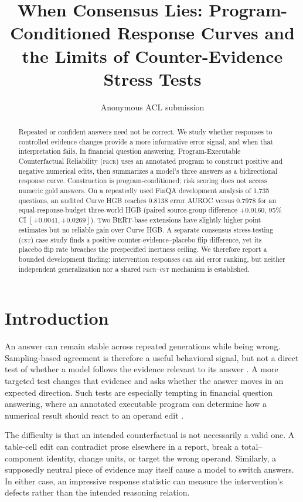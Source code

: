 \documentclass[11pt]{article}
\title{When Consensus Lies: Program-Conditioned Response Curves and the Limits of Counter-Evidence Stress Tests}
\author{Anonymous ACL submission}
\newcommand{\PECR}{\textsc{pecr}}
\newcommand{\CST}{\textsc{cst}}
\begin{document}
\maketitle

\begin{abstract}
Repeated or confident answers need not be correct. We study whether responses to controlled evidence changes provide a more informative error signal, and when that interpretation fails. In financial question answering, Program-Executable Counterfactual Reliability (\PECR{}) uses an annotated program to construct positive and negative numerical edits, then summarizes a model's three answers as a bidirectional response curve. Construction is program-conditioned; risk scoring does not access numeric gold answers. On a repeatedly used FinQA development analysis of 1,735 questions, an audited Curve HGB reaches 0.8138 error AUROC versus 0.7978 for an equal-response-budget three-world HGB (paired source-group difference $+0.0160$, 95\% CI $[+0.0041,+0.0269]$). Two BERT-base extensions have slightly higher point estimates but no reliable gain over Curve HGB. A separate consensus stress-testing (\CST{}) case study finds a positive counter-evidence--placebo flip difference, yet its placebo flip rate breaches the prespecified inertness ceiling. We therefore report a bounded development finding: intervention responses can aid error ranking, but neither independent generalization nor a shared \PECR{}--\CST{} mechanism is established.
\end{abstract}

\section{Introduction}
An answer can remain stable across repeated generations while being wrong. Sampling-based agreement is therefore a useful behavioral signal, but not a direct test of whether a model follows the evidence relevant to its answer \citep{manakul-etal-2023-selfcheckgpt}. A more targeted test changes that evidence and asks whether the answer moves in an expected direction. Such tests are especially tempting in financial question answering, where an annotated executable program can determine how a numerical result should react to an operand edit \citep{chen-etal-2021-finqa}.

The difficulty is that an intended counterfactual is not necessarily a valid one. A table-cell edit can contradict prose elsewhere in a report, break a total--component identity, change units, or target the wrong operand. Similarly, a supposedly neutral piece of evidence may itself cause a model to switch answers. In either case, an impressive response statistic can measure the intervention's defects rather than the intended reasoning relation.
\end{document}
